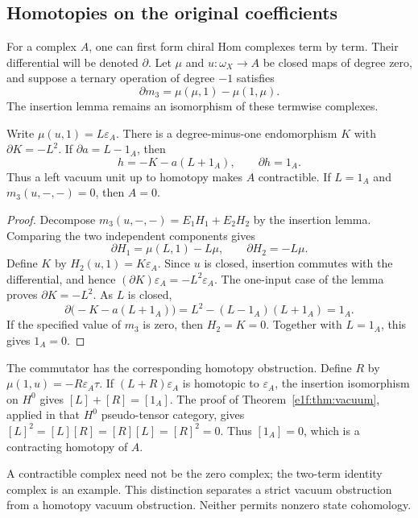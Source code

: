 \subsection{Homotopies on the original coefficients}

For\label{e1f:def:termwise-homotopy-input} a complex \(A\), one can first form chiral Hom complexes
term by term. Their differential will be denoted \(\partial\).
Let \(\mu\) and \(u:\omega_X\to A\) be closed maps of
degree zero, and suppose a ternary operation of degree \(-1\)
satisfies
\[
 \partial m_3=\mu(\mu,1)-\mu(1,\mu).
\]
The insertion lemma remains an isomorphism of these termwise
complexes.

\begin{proposition}\label{e1f:prop:homotopy-vacuum}
Write \(\mu(u,1)=L\varepsilon_A\). There is a degree-minus-one
endomorphism \(K\) with \(\partial K=-L^2\). If
\(\partial a=L-1_A\), then
\[
 h=-K-a(L+1_A),\qquad \partial h=1_A.
\]
Thus a left vacuum unit up to homotopy makes \(A\) contractible.
If \(L=1_A\) and \(m_3(u,-,-)=0\), then \(A=0\).
\end{proposition}

\begin{proof}
Decompose
\(m_3(u,-,-)=E_1H_1+E_2H_2\) by the insertion lemma.
Comparing the two independent components gives
\[
 \partial H_1=\mu(L,1)-L\mu,
 \qquad \partial H_2=-L\mu.
\]
Define \(K\) by \(H_2(u,1)=K\varepsilon_A\). Since \(u\)
is closed, insertion commutes with the differential, and hence
\((\partial K)\varepsilon_A=-L^2\varepsilon_A\).
The one-input case of the lemma proves \(\partial K=-L^2\).
As \(L\) is closed,
\[
 \partial\bigl(-K-a(L+1_A)\bigr)
 =L^2-(L-1_A)(L+1_A)=1_A.
\]
If the specified value of \(m_3\) is zero, then \(H_2=K=0\).
Together with \(L=1_A\), this gives \(1_A=0\).
\end{proof}

The commutator has the corresponding homotopy obstruction.
Define \(R\) by \(\mu(1,u)=-R\varepsilon_A\tau\).
If \((L+R)\varepsilon_A\) is homotopic to \(\varepsilon_A\),
the insertion isomorphism on \(H^0\) gives
\([L]+[R]=[1_A]\). The proof of
Theorem~\ref{e1f:thm:vacuum}, applied in that \(H^0\)
pseudo-tensor category, gives
\([L]^2=[L][R]=[R][L]=[R]^2=0\). Thus \([1_A]=0\),
which is a contracting homotopy of \(A\).

A contractible complex need not be the zero complex; the
two-term identity complex is an example. This distinction
separates a strict vacuum obstruction from a homotopy vacuum
obstruction. Neither permits nonzero state cohomology.

